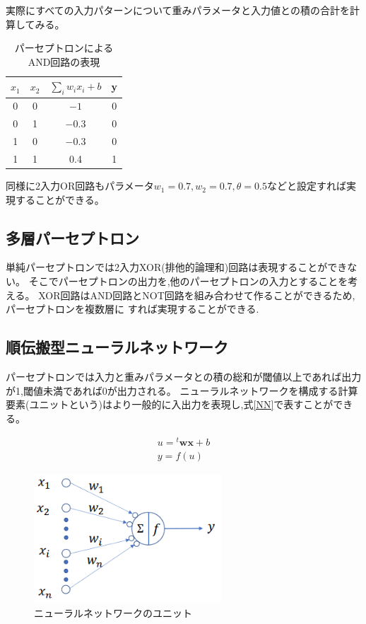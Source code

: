   実際にすべての入力パターンについて重みパラメータと入力値との積の合計を計算してみる。

  \begin{table}[htb]
    \centering
    \caption{パーセプトロンによるAND回路の表現}
    \begin{tabular}{|c|c|c|c|} \hline
      $x_1$ & $x_2$ & $\sum_i{w_i x_i}+b$ & y \\ \hline
      0 & 0 & $-1$ & 0 \\ \hline
      0 & 1 & $-0.3$ & 0 \\ \hline
      1 & 0 & $-0.3$ & 0 \\ \hline
      1 & 1 & 0.4 & 1 \\ \hline
    \end{tabular}
  \end{table}

  同様に2入力OR回路もパラメータ$w_1 = 0.7, w_2 = 0.7, \theta = 0.5$などと設定すれば実現することができる。

\subsection{多層パーセプトロン}
  単純パーセプトロンでは2入力XOR(排他的論理和)回路は表現することができない。
  そこでパーセプトロンの出力を,他のパーセプトロンの入力とすることを考える。
  XOR回路はAND回路とNOT回路を組み合わせて作ることができるため,パーセプトロンを複数層に
  すれば実現することができる.
  
\subsection{順伝搬型ニューラルネットワーク}
パーセプトロンでは入力と重みパラメータとの積の総和が閾値以上であれば出力が1,閾値未満であれば0が出力される。
ニューラルネットワークを構成する計算要素(ユニットという)はより一般的に入出力を表現し,式\ref{NN}で表すことができる。

  \begin{equation}
    \label{NN}
    \begin{aligned}
    u ={}^t \bm{wx} + b \\
    y = f(u)
    \end{aligned}
  \end{equation}

  \begin{figure}[htb]
    \begin{center}
      \includegraphics[clip, width=7.0cm]{./figure/neuralnetworkunit.png}
      \caption{ニューラルネットワークのユニット}
    \end{center}
  \end{figure}
  

